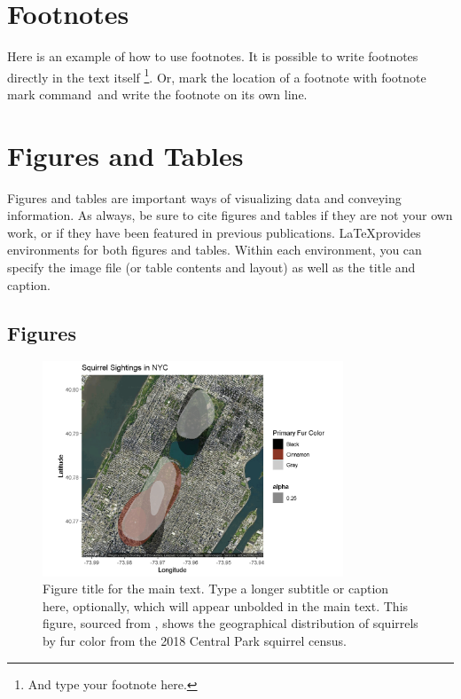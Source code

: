 \section{Footnotes}

Here is an example of how to use footnotes. It is possible to write footnotes directly in the text itself \footnote{And type your footnote here.}. Or, mark the location of a footnote with footnote mark command\footnotemark \, and write the footnote on its own line. 


\section{Figures and Tables}

Figures and tables are important ways of visualizing data and conveying information. As always, be sure to cite figures and tables if they are not your own work, or if they have been featured in previous publications. \LaTeX provides environments for both figures and tables. Within each environment, you can specify the image file (or table contents and layout) as well as the title and caption. 

\subsection{Figures}

\begin{figure}[h]
\begin{center}
	\includegraphics[width=0.8\textwidth]{figures/SquirrelData.png} %
	\caption[Figure title for the List of Figures]{ 
    Figure title for the main text. %
    \textmd{Type a longer subtitle or caption here, optionally, which will appear unbolded in the main text. This figure, sourced from \cite{squirreldata}, shows the geographical distribution of squirrels by fur color from the 2018 Central Park squirrel census.}
    }
    \label{fig:figurelabel} %
    \end{center}
\end{figure}

